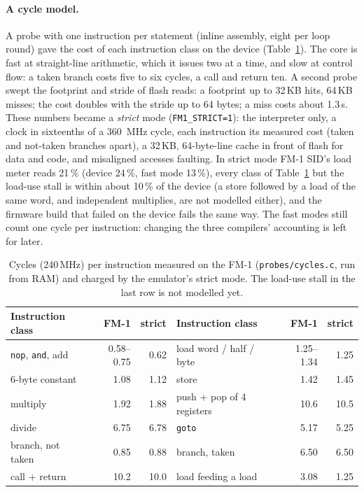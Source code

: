 \documentclass[10pt,a4paper]{article}
\newcommand{\code}[1]{\texttt{#1}}
\begin{document}
\paragraph{A cycle model.} A probe with one instruction per statement (inline assembly, eight per
loop round) gave the cost of each instruction class on the device (Table~\ref{tab:cyc}). The core is
fast at straight-line arithmetic, which it issues two at a time, and slow at control flow: a taken
branch costs five to six cycles, a call and return ten. A second probe swept the footprint and stride
of flash reads: a footprint up to 32\,KB hits, 64\,KB misses; the cost doubles with the stride up to
64 bytes; a miss costs about 1.3\,\textmu s. These numbers became a \emph{strict} mode
(\code{FM1\_STRICT=1}): the interpreter only, a clock in sixteenths of a 360~MHz cycle, each instruction its
measured cost (taken and not-taken branches apart), a 32\,KB, 64-byte-line cache in front of flash
for data and code, and misaligned accesses faulting. In strict mode FM-1 SID's load meter reads
21\,\% (device 24\,\%, fast mode 13\,\%), every class of Table~\ref{tab:cyc} but the load-use stall
is within about 10\,\% of the device (a store followed by a load of the same word, and independent
multiplies, are not modelled either), and the firmware build that failed on the device fails the
same way. The fast modes still count one cycle per instruction: changing the three
compilers' accounting is left for later.

\begin{table}[t]
\centering\footnotesize
\begin{tabular}{@{}lrrlrr@{}}
\toprule
Instruction class & FM-1 & strict & Instruction class & FM-1 & strict\\
\midrule
\code{nop}, \code{and}, add & 0.58--0.75 & 0.62 & load word / half / byte & 1.25--1.34 & 1.25\\
6-byte constant & 1.08 & 1.12 & store & 1.42 & 1.45\\
multiply & 1.92 & 1.88 & push + pop of 4 registers & 10.6 & 10.5\\
divide & 6.75 & 6.78 & \code{goto} & 5.17 & 5.25\\
branch, not taken & 0.85 & 0.88 & branch, taken & 6.50 & 6.50\\
call + return & 10.2 & 10.0 & load feeding a load & 3.08 & 1.25\\
\bottomrule
\end{tabular}
\caption{Cycles (240\,MHz) per instruction measured on the FM-1 (\code{probes/cycles.c}, run from
RAM) and charged by the emulator's strict mode. The load-use stall in the last row is not modelled
yet.}
\label{tab:cyc}
\end{table}
\end{document}
